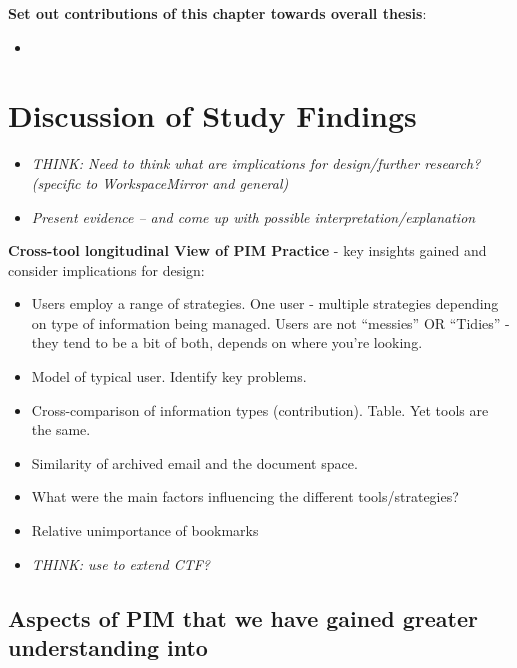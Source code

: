 \textbf{Set out contributions of this chapter towards overall thesis}:
\begin{itemize}
	\item 
\end{itemize}




\section{Discussion of Study Findings}
\label{ch7:study-discussion}


\begin{itemize}
	\item \textit{THINK: Need to think what are implications for design/further research?  (specific to WorkspaceMirror and general)}
	\item \textit{Present evidence -- and come up with possible interpretation/explanation}
\end{itemize}

	
\textbf{Cross-tool longitudinal View of PIM Practice} - key insights gained and consider implications for design:
\begin{itemize}
		\item Users employ a range of strategies. One user - multiple strategies depending on type of information being managed. Users are not "`messies"' OR "`Tidies"' - they tend to be a bit of both, depends on where you're looking.
		\item Model of typical user. Identify key problems.
		\item Cross-comparison of information types (contribution). Table. Yet tools are the same.
		\item Similarity of archived email and the document space.
		\item What were the main factors influencing the different tools/strategies?
		\item Relative unimportance of bookmarks
		
		\item \textit{THINK: use to extend CTF?}
\end{itemize}


\subsection{Aspects of PIM that we have gained greater understanding into}

